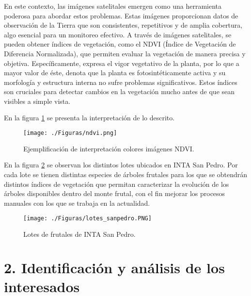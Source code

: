 \documentclass[
11pt, %
]{charter}
\begin{document}
En este contexto, las imágenes satelitales emergen como una herramienta poderosa para abordar estos problemas. Estas imágenes proporcionan datos 
de observación de la Tierra que son consistentes, repetitivos y de amplia cobertura, algo esencial para un monitoreo efectivo. 
A través de imágenes satelitales, se pueden obtener índices de vegetación, como el NDVI (Índice de Vegetación de Diferencia Normalizada), 
que permiten evaluar la vegetación de manera precisa y objetiva. Específicamente, expresa el vigor vegetativo de la planta, por lo que a mayor valor de éste, denota que la planta es fotosintéticamente 
activa y su morfología y estructura interna no sufre problemas significativos. Estos índices son cruciales para detectar cambios en la vegetación mucho antes 
de que sean visibles a simple vista. 

En la figura \ref{fig:ndvi} se presenta la interpretación de lo descrito.

\begin{figure}[htpb]
\centering 
\texttt{[image: ./Figuras/ndvi.png]}
\caption{Ejemplificación de interpretación colores imágenes NDVI.}
\label{fig:ndvi}
\end{figure}

En la figura \ref{fig:lotes} se observan los distintos lotes ubicados en INTA San Pedro. Por cada lote se
tienen distintas especies de árboles frutales para los que se obtendrán distintos índices de vegetación
que permitan caracterizar la evolución de los árboles disponibles dentro del monte frutal, con el fin mejorar 
los procesos manuales con los que se trabaja en la actualidad.


\begin{figure}[htpb]
    \centering 
    \texttt{[image: ./Figuras/lotes\_sanpedro.PNG]}
    \caption{Lotes de frutales de INTA San Pedro.}
    \label{fig:lotes}
\end{figure}


\section{2. Identificación y análisis de los interesados}
\label{sec:interesados}
\end{document}
